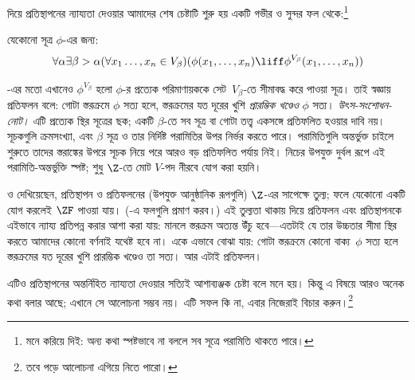 \documentclass[../../../include/open-logic-section]{subfiles}
\begin{document}

\stagesinex{} দিয়ে প্রতিস্থাপনের ন্যায্যতা
দেওয়ার আমাদের শেষ চেষ্টাটি শুরু হয়
একটি গভীর ও সুন্দর ফল থেকে:\footnote{মনে
করিয়ে দিই: অন্য কথা স্পষ্টভাবে না
বললে সব সূত্রে পরামিতি থাকতে পারে।}
\begin{thm}[প্রতিফলন ছক]
যেকোনো সূত্র $\phi$-এর জন্য:
\[
\forall \alpha \exists \beta > \alpha (\forall x_1 \ldots, x_n \in
V_\beta)(\phi(x_1, \ldots, x_n) \liff \phi^{V_\beta}(x_1, \ldots, x_n))
\]
\end{thm}
\noindent
{}-এর
মতো এখানেও $\phi^{V_\beta}$ হলো
$\phi$-র প্রত্যেক পরিমাণায়ককে
সেট~$V_\beta$-তে সীমাবদ্ধ করে
পাওয়া সূত্র। তাই স্বজ্ঞায় প্রতিফলন
বলে: গোটা স্তরক্রমে $\phi$ সত্য হলে,
স্তরক্রমের যত দূরের খুশি \emph{প্রারম্ভিক
খণ্ডেও} $\phi$ সত্য।
\emph{উৎস-সংশোধন-নোট।} এটি প্রত্যেক স্থির সূত্রের ছক;
একটি $\beta$-তে সব সূত্র বা গোটা তত্ত্ব একসঙ্গে প্রতিফলিত
হওয়ার দাবি নয়। সূচকগুলি ক্রমসংখ্যা, এবং $\beta$ সূত্র ও
তার নির্দিষ্ট পরামিতির উপর নির্ভর করতে পারে। পরামিতিগুলি
অন্তর্ভুক্ত চাইলে শুরুতে তাদের স্তরাঙ্কের উপরে সূচক নিয়ে
পরে আরও বড় প্রতিফলিত পর্যায় নিই। নিচের উপযুক্ত দুর্বল
রূপে এই পরামিতি-অন্তর্ভুক্তি স্পষ্ট; শুধু $\Z$-তে মোট
$V$-পদ নীরবে যোগ করা হয়নি।

\citet{Montague1961} ও \citet{Levy1960}
দেখিয়েছেন, প্রতিস্থাপন ও প্রতিফলনের
(উপযুক্ত আনুষ্ঠানিক রূপগুলি) $\Z$-এর
সাপেক্ষে তুল্য; ফলে যেকোনো একটি
যোগ করলেই $\ZF$ পাওয়া যায়।
(-এ
ফলগুলি প্রমাণ করব।) এই তুল্যতা
থাকায় \stagesinex{} দিয়ে প্রতিফলন
এবং প্রতিস্থাপনকে এইভাবে ন্যায্য
প্রতিপন্ন করার আশা করা যায়:
\stagesinex{} মানলে স্তরক্রম অত্যন্ত
উঁচু হবে—এতটাই যে তার উচ্চতার
সীমা স্থির করতে আমাদের কোনো
বর্ণনাই যথেষ্ট হবে না। একে এভাবে
বোঝা যায়: গোটা স্তরক্রমে কোনো
বাক্য~$\phi$ সত্য হলে স্তরক্রমের
যত দূরের খুশি প্রারম্ভিক খণ্ডেও
তা সত্য। আর এটাই প্রতিফলন।

এটিও প্রতিস্থাপনের অন্তর্নিহিত ন্যায্যতা
দেওয়ার সত্যিই আশাব্যঞ্জক চেষ্টা
বলে মনে হয়। কিন্তু এ বিষয়ে আরও
অনেক কথা বলার আছে; এখানে সে
আলোচনা সম্ভব নয়। এটি সফল কি
না, এবার নিজেরাই বিচার করুন।\footnote{তবে
\citet[95--100]{Incurvati2020} পড়ে
আলোচনা এগিয়ে নিতে পারো।}
\end{document}
